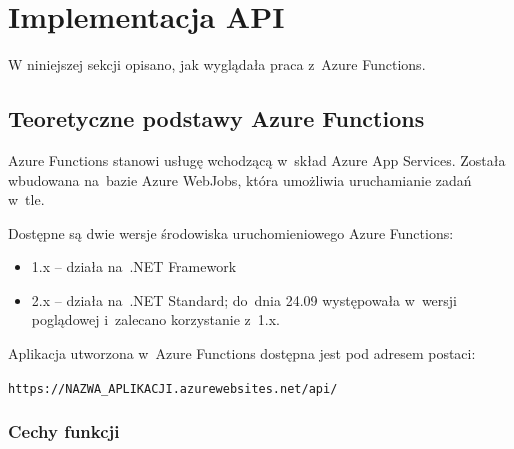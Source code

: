 \documentclass[12pt,a4paper,twoside,titlepage,openright]{book}
\begin{document}
\section{Implementacja API}


W niniejszej sekcji opisano, jak wyglądała praca z~Azure Functions.

\subsection{Teoretyczne podstawy Azure Functions}

Azure Functions stanowi usługę wchodzącą w~skład Azure App Services. Została wbudowana na~bazie Azure WebJobs, która umożliwia uruchamianie zadań w~tle.

Dostępne są dwie wersje środowiska uruchomieniowego Azure Functions: \cite{siteAzureFunctions2}
\begin{itemize}
\item 1.x -- działa na~.NET Framework
\item 2.x -- działa na~.NET Standard; do~dnia 24.09 występowała w~wersji poglądowej i~zalecano korzystanie z~1.x.
\end{itemize} 

Aplikacja utworzona w~Azure Functions dostępna jest pod adresem postaci:

\texttt{https://NAZWA\_APLIKACJI.azurewebsites.net/api/}

\subsubsection{Cechy funkcji}
\end{document}
